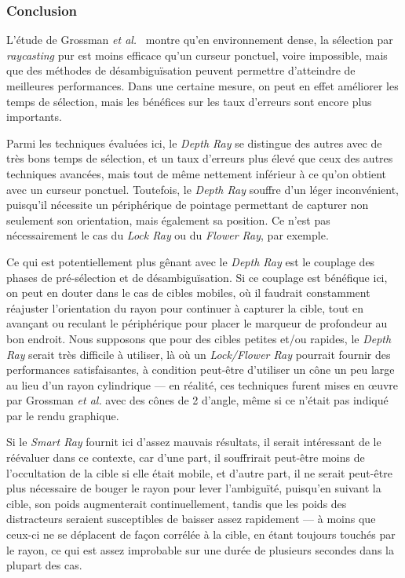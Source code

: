 	\subsubsection{Conclusion}
	L'étude de Grossman \emph{et al.}~\cite{grossman2006design} montre qu'en environnement dense, la sélection par \emph{raycasting} pur est moins efficace qu'un curseur ponctuel, voire impossible, mais que des méthodes de désambiguïsation peuvent permettre d'atteindre de meilleures performances. Dans une certaine mesure, on peut en effet améliorer les temps de sélection, mais les bénéfices sur les taux d'erreurs sont encore plus importants.
	
	Parmi les techniques évaluées ici, le \emph{Depth Ray} se distingue des autres avec de très bons temps de sélection, et un taux d'erreurs plus élevé que ceux des autres techniques avancées, mais tout de même nettement inférieur à ce qu'on obtient avec un curseur ponctuel. Toutefois, le \emph{Depth Ray} souffre d'un léger inconvénient, puisqu'il nécessite un périphérique de pointage permettant de capturer non seulement son orientation, mais également sa position. Ce n'est pas nécessairement le cas du \emph{Lock Ray} ou du \emph{Flower Ray}, par exemple.
	
	Ce qui est potentiellement plus gênant avec le \emph{Depth Ray} est le couplage des phases de pré-sélection et de désambiguïsation. Si ce couplage est bénéfique ici, on peut en douter dans le cas de cibles mobiles, où il faudrait constamment réajuster l'orientation du rayon pour continuer à \og capturer \fg{} la cible, tout en avançant ou reculant le périphérique pour placer le marqueur de profondeur au bon endroit. Nous supposons que pour des cibles petites et/ou rapides, le \emph{Depth Ray} serait très difficile à utiliser, là où un \emph{Lock/Flower Ray} pourrait fournir des performances satisfaisantes, à condition peut-être d'utiliser un cône un peu large au lieu d'un rayon cylindrique --- en réalité, ces techniques furent mises en \oe{}uvre par Grossman \emph{et al.} avec des cônes de 2\textdegree{} d'angle, même si ce n'était pas indiqué par le rendu graphique.
	
	Si le \emph{Smart Ray} fournit ici d'assez mauvais résultats, il serait intéressant de le réévaluer dans ce contexte, car d'une part, il souffrirait peut-être moins de l'occultation de la cible si elle était mobile, et d'autre part, il ne serait peut-être plus nécessaire de bouger le rayon pour lever l'ambiguïté, puisqu'en suivant la cible, son poids augmenterait continuellement, tandis que les poids des distracteurs seraient susceptibles de baisser assez rapidement --- à moins que ceux-ci ne se déplacent de façon corrélée à la cible, en étant toujours touchés par le rayon, ce qui est assez improbable sur une durée de plusieurs secondes dans la plupart des cas.
	
